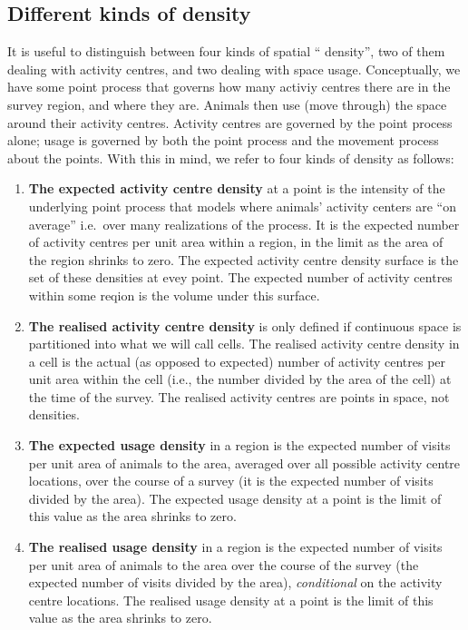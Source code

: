 \documentclass[10pt,a4paper]{article}
\begin{document}

\subsection{Different kinds of density}

It is useful to distinguish between four kinds of spatial `` density'', two of them dealing with activity centres, and two dealing with space usage. Conceptually, we have some point process that governs how many activiy centres there are in the survey region, and where they are. Animals then use (move through) the space around their activity centres. Activity centres are governed by the point process alone; usage is governed by both the point process and the movement process about the points. With this in mind, we refer to four kinds of density as follows:

\begin{enumerate}
\item \textbf{The expected activity centre density} at a point is the intensity of the underlying point process that models where animals' activity centers are ``on average''  i.e.\ over many realizations of the process. It is the expected number of activity centres per unit area within a region, in the limit as the area of the region shrinks to zero. The expected activity centre density surface is the set of these densities at evey point. The expected number of activity centres within some reqion is the volume under this surface.
\item \textbf{The realised activity centre density} is only defined if continuous space is partitioned into what we will call cells. The realised activity centre density in a cell is the actual (as opposed to expected) number of activity centres per unit area within the cell (i.e., the number divided by the area of the cell) at the time of the survey. The realised activity centres are points in space, not densities.
\item \textbf{The expected usage density} in a region is the expected number of visits per unit area of animals to the area, averaged over all possible activity centre locations, over the course of a survey (it is the expected number of visits divided by the area). The expected usage density at a point is the limit of this value as the area shrinks to zero. 
\item \textbf{The realised usage density} in a region is the expected number of visits per unit area of animals to the area over the course of the survey (the expected number of visits divided by the area), \textit{conditional} on the activity centre locations. The realised usage density at a point is the limit of this value as the area shrinks to zero. 
\end{enumerate}
\end{document}
